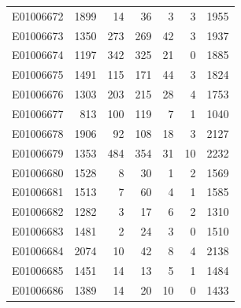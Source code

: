 \documentclass[
  letterpaper,
  DIV=11,
  numbers=noendperiod]{scrreprt}
\begin{document}
\begin{tabular}{lrrrrrr}
E01006672     &    1899 &      14 &                    36 &                               3 &                       3 &              1955 \\
E01006673     &    1350 &     273 &                   269 &                              42 &                       3 &              1937 \\
E01006674     &    1197 &     342 &                   325 &                              21 &                       0 &              1885 \\
E01006675     &    1491 &     115 &                   171 &                              44 &                       3 &              1824 \\
E01006676     &    1303 &     203 &                   215 &                              28 &                       4 &              1753 \\
E01006677     &     813 &     100 &                   119 &                               7 &                       1 &              1040 \\
E01006678     &    1906 &      92 &                   108 &                              18 &                       3 &              2127 \\
E01006679     &    1353 &     484 &                   354 &                              31 &                      10 &              2232 \\
E01006680     &    1528 &       8 &                    30 &                               1 &                       2 &              1569 \\
E01006681     &    1513 &       7 &                    60 &                               4 &                       1 &              1585 \\
E01006682     &    1282 &       3 &                    17 &                               6 &                       2 &              1310 \\
E01006683     &    1481 &       2 &                    24 &                               3 &                       0 &              1510 \\
E01006684     &    2074 &      10 &                    42 &                               8 &                       4 &              2138 \\
E01006685     &    1451 &      14 &                    13 &                               5 &                       1 &              1484 \\
E01006686     &    1389 &      14 &                    20 &                              10 &                       0 &              1433 \\

\end{tabular}
\end{document}
